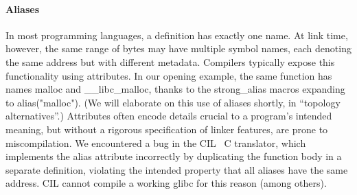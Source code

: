 


\paragraph{Aliases}
In most programming languages, a definition has exactly one name. 
At link time, however, the same range of bytes may have multiple symbol names, 
each denoting the same address but with different metadata.
Compilers typically expose this functionality using attributes.
In our opening example, the same function has names \textsf{malloc} and \textsf{\_\_libc\_malloc},
thanks to the \textsf{strong\_alias} macros expanding to \textsf{alias("malloc")}.
(We will elaborate on this use of aliases shortly, in ``topology alternatives''.)
Attributes often encode details crucial to a program's intended meaning,
but without a rigorous specification of linker features, are prone to miscompilation.
We encountered a bug in the CIL~\cite{necula-cil-2002} C translator, which implements the \textsf{alias} attribute incorrectly by duplicating the function body in a separate definition,
violating the intended property that all aliases have the same address.
CIL cannot compile a working \textsf{glibc} for this reason (among others).



